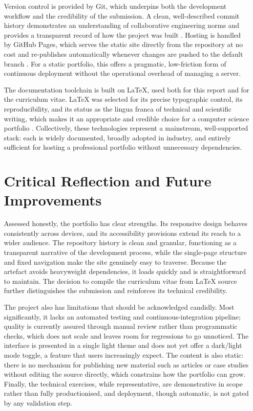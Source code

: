 \documentclass[11pt,a4paper]{article}
\begin{document}
Version control is provided by Git, which underpins both the development workflow and the credibility of the submission. A clean, well-described commit history demonstrates an understanding of collaborative engineering norms and provides a transparent record of how the project was built \citep{chacon2014}. Hosting is handled by GitHub Pages, which serves the static site directly from the repository at no cost and re-publishes automatically whenever changes are pushed to the default branch \citep{github2024}. For a static portfolio, this offers a pragmatic, low-friction form of continuous deployment without the operational overhead of managing a server.

The documentation toolchain is built on \LaTeX, used both for this report and for the curriculum vitae. \LaTeX{} was selected for its precise typographic control, its reproducibility, and its status as the lingua franca of technical and scientific writing, which makes it an appropriate and credible choice for a computer science portfolio \citep{lamport1994}. Collectively, these technologies represent a mainstream, well-supported stack: each is widely documented, broadly adopted in industry, and entirely sufficient for hosting a professional portfolio without unnecessary dependencies.

\section{Critical Reflection and Future Improvements}
Assessed honestly, the portfolio has clear strengths. Its responsive design behaves consistently across devices, and its accessibility provisions extend its reach to a wider audience. The repository history is clean and granular, functioning as a transparent narrative of the development process, while the single-page structure and fixed navigation make the site genuinely easy to traverse. Because the artefact avoids heavyweight dependencies, it loads quickly and is straightforward to maintain. The decision to compile the curriculum vitae from \LaTeX{} source further distinguishes the submission and reinforces its technical credibility.

The project also has limitations that should be acknowledged candidly. Most significantly, it lacks an automated testing and continuous-integration pipeline; quality is currently assured through manual review rather than programmatic checks, which does not scale and leaves room for regressions to go unnoticed. The interface is presented in a single light theme and does not yet offer a dark/light mode toggle, a feature that users increasingly expect. The content is also static: there is no mechanism for publishing new material such as articles or case studies without editing the source directly, which constrains how the portfolio can grow. Finally, the technical exercises, while representative, are demonstrative in scope rather than fully productionised, and deployment, though automatic, is not gated by any validation step.
\end{document}
